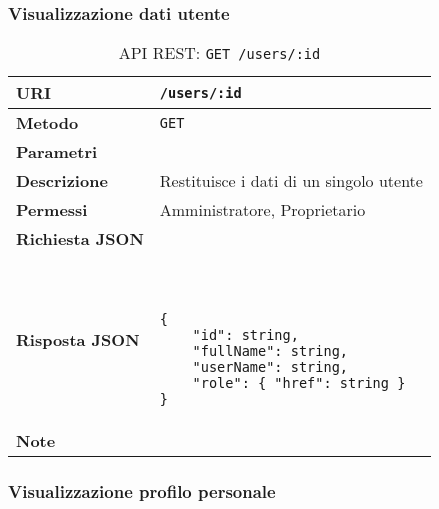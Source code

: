     \subsubsection{Visualizzazione dati utente}

        \begin{table}[H]
            \begin{center}
                \begin{tabular}{p{} p{}}
                    \toprule
                    \textbf{URI} & \texttt{/users/:id} \\ \midrule
                    \textbf{Metodo} & \texttt{GET} \\ \midrule
                    \textbf{Parametri} & \\ \midrule
                    \textbf{Descrizione} & Restituisce i dati di un singolo utente \\ \midrule
                    \textbf{Permessi} & Amministratore, Proprietario  \\ \midrule
                    \textbf{Richiesta JSON} & \\ \midrule
                    \textbf{Risposta JSON} & \
                        \begin{lstlisting}[basicstyle={\ttfamily}]
{
    "id": string,
    "fullName": string,
    "userName": string,
    "role": { "href": string }
}
                        \end{lstlisting}
                        \\ \midrule
                    \textbf{Note} & \\
                    \bottomrule
                \end{tabular}
                \caption{API REST: \texttt{GET /users/:id}}
            \end{center}
        \end{table}

    \subsubsection{Visualizzazione profilo personale}

